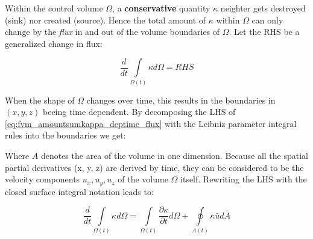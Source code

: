 Within the control volume $\Omega$, a \textbf{conservative} quantity $\kappa$  neighter gets destroyed (sink) nor created (source). Hence the total amount of 
$\kappa$ within $\Omega$ can only change by the \emph{flux} in and out of the volume boundaries of $\Omega$. Let the RHS be a generalized change in flux:

\begin{equation}\label{eq:fvm_amountsumkappa_deptime_flux}
\frac {d}{dt} \int\limits_{\Omega (t)} \kappa d \Omega = RHS
\end{equation}

When the shape of $\Omega$ changes over time, this results in the boundaries in  $(x, y, z)$ beeing time dependent. By decomposing the LHS of \ref{eq:fvm_amountsumkappa_deptime_flux} with the Leibniz parameter integral rules into the boundaries we get:


Where $A$ denotes the area of the volume in one dimension. Because all the spatial partial derivatives (x, y, z) are derived by time, they can be considered to be the velocity components $u_{x}, u_{y}, u_{z}$ of the volume $\Omega$ itself. Rewriting the LHS with the closed surface integral notation leads to:

\begin{equation}\label{eq:fvm_amountsumkappa_deptime_oint}
\frac {d}{dt} \int\limits_{\Omega (t)} \kappa d \Omega = 
\int\limits_{\Omega (t)} \frac{\partial \kappa}{\partial t} d \Omega  + 
\oint\limits_{A(t)} \kappa \bar{u} d \bar{A}   
\end{equation}

